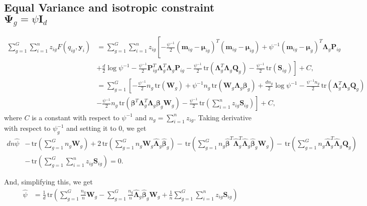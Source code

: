 \documentclass[12pt]{article}
\newcommand{\bI}{\mathbf{I}}
\newcommand{\bP}{\mathbf{P}}
\newcommand{\bQ}{\mathbf{Q}}
\newcommand{\bW}{\mathbf{W}}
\newcommand{\bmm}{\mathbf{m}}
\newcommand{\by}{\mathbf{y}}
\newcommand{\bbeta}{\boldsymbol{\beta}}
\newcommand{\bmu}{\boldsymbol{\mu}}
\newcommand{\bLambda}{\boldsymbol{\Lambda}}
\newcommand{\bPsi}{\boldsymbol{\Psi}}
\newcommand{\tr}{\,\mbox{tr}}
\begin{document}
\subsection{Equal Variance and isotropic constraint $\bPsi_g=\psi\bI_d$}
\begin{align*}
\sum_{g=1}^G\sum_{i=1}^nz_{ig}F(q_{ig},\by_i)&=\sum_{g=1}^G\sum_{i=1}^nz_{ig}\left[-\frac{\psi^{-1}}{2}(\bmm_{ig}-\bmu_{ig})^T(\bmm_{ig}-\bmu_{ig})+\psi^{-1}(\bmm_{ig}-\bmu_g)^T\bLambda_g\bP_{ig}  \right.\\
&\left.+\frac{d}{2} \log \psi^{-1}-\frac{\psi^{-1}}{2}\bP_{ig}^T\bLambda_g^T\bLambda_g\bP_{ig}-\frac{\psi^{-1}}{2}\tr(\bLambda_g^T\bLambda_g\bQ_{g})-\frac{\psi^{-1}}{2}\tr\left(\mathbf{S}_{ig}\right)  \right]+C,\\[3pt]
&=\sum_{g=1}^G\left[-\frac{\psi^{-1}}{2}n_g\tr(\bW_{g})+\psi^{-1}n_g\tr(\bW_g\bLambda_g\bbeta_g)+\frac{dn_g}{2}\log \psi^{-1}-\frac{\psi{^{-1}}n_g}{2}\tr(\bLambda_g^T\bLambda_g\bQ_{g})\right.\\
&\left.-\frac{\psi{^{-1}}}{2}n_g\tr(\bbeta^T\bLambda_g^T\bLambda_g\bbeta_g\bW_g)-\frac{\psi^{-1}}{2}\tr\left(\sum_{i=1}^nz_{ig}\mathbf{S}_{ig}\right)\right]+C,
\end{align*}
where $C$ is a constant with respect to $\psi^{-1}$ and $n_g=\sum_{i=1}^nz_{ig}$. Taking derivative with respect to $\psi^{-1}_g$ and setting it to 0, we get
 \begin{align*}
dn\hat{\psi}&-\tr(\sum_{g=1}^Gn_g\bW_g)+ 2\tr(\sum_{g=1}^Gn_g\bW_g\hat{\bLambda}_g\hat{\bbeta}_g)-\tr(\sum_{g=1}^Gn_g\hat{\bbeta}^T\hat{\bLambda}_g^T\hat{\bLambda}_g\hat{\bbeta}_g\bW_g)-\tr(\sum_{g=1}^Gn_g\hat{\bLambda}_g^T\hat{\bLambda}_g\bQ_{g})\\
&-\tr\left(\sum_{g=1}^G\sum_{i=1}^nz_{ig}\mathbf{S}_{ig}\right)=0.
\end{align*}

And, simplifying this, we get
\begin{align}
\hat{\psi}&=\frac{1}{d}\tr\left(\sum_{g=1}^G\frac{n_g}{n}\bW_g-\sum_{g=1}^G\frac{n_g}{n}\hat{\bLambda}_g\hat{\bbeta}_g\bW_g+\frac{1}{n}\sum_{g=1}^G\sum_{i=1}^nz_{ig}\mathbf{S}_{ig}\right)
\end{align}
\end{document}
